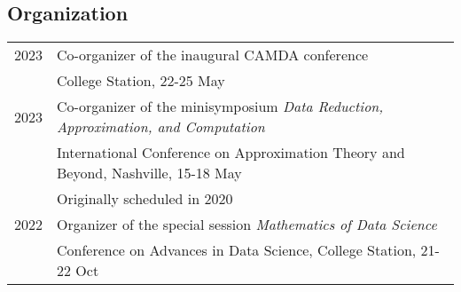 \documentclass[11pt]{article}
\begin{document}
\subsection{Organization}

\begin{tabular}{ll}
2023\phantom{-??} & Co-organizer of the inaugural CAMDA conference\\
& College Station, 22-25 May\\
2023 & Co-organizer of the minisymposium {\sl Data Reduction, Approximation, and Computation}\\
& International Conference on Approximation Theory and Beyond, Nashville,  15-18 May\\
& {\small Originally scheduled in 2020}\\
2022 & Organizer of the special session {\em Mathematics of Data Science}\\
& Conference on Advances in Data Science, College Station, 21-22 Oct
\end{tabular}
\end{document}
